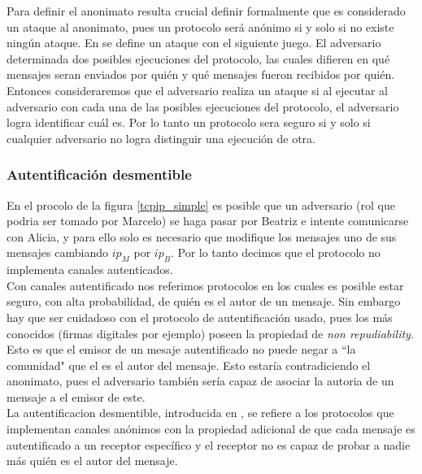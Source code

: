 Para definir el anonimato resulta crucial definir formalmente que es considerado
un ataque al anonimato, pues un protocolo será anónimo si y solo si no existe ningún ataque.
En \cite{conf/pet/HeviaM08} se define un ataque con el siguiente juego.
El adversario determinada dos posibles ejecuciones del protocolo, las cuales difieren en
qué mensajes seran enviados por quién y qué mensajes fueron recibidos por quién. Entonces
consideraremos que el adversario realiza un ataque si al ejecutar al adversario con cada una
de las posibles ejecuciones del protocolo, el adversario logra identificar cuál es.
Por lo tanto un protocolo sera seguro si y solo si cualquier adversario no logra distinguir
una ejecución de otra.

\subsubsection{Autentificación desmentible}
En el procolo de la figura \ref{tcpip_simple} es posible que un adversario (rol que podria ser
tomado por Marcelo) se haga pasar por Beatriz e intente comunicarse con Alicia, y para ello
solo es necesario que modifique los mensajes uno de sus mensajes cambiando $ip_M$ por $ip_B$.
Por lo tanto decimos que el protocolo no implementa canales autenticados.\\
Con canales autentificado nos referimos protocolos en los cuales es posible estar seguro,
con alta probabilidad, de quién es el autor de un mensaje. Sin embargo hay que ser cuidadoso
con el protocolo de autentificación usado, pues los más conocidos
(firmas digitales por ejemplo) poseen la propiedad de \textit{non repudiability}. Esto es
que el emisor de un mesaje autentificado no puede negar a ``la comunidad" que el es el autor
del mensaje. Esto estaría contradiciendo el anonimato, pues el adversario también sería capaz
de asociar la autoria de un mensaje a el emisor de este.\\
La autentificacion desmentible, introducida en \cite{DwoNaoSah04}, se refiere a los protocolos
que implementan canales anónimos con la propiedad adicional de que cada mensaje es autentificado
a un receptor específico y el receptor no es capaz de probar a nadie más quién es el autor del mensaje.

